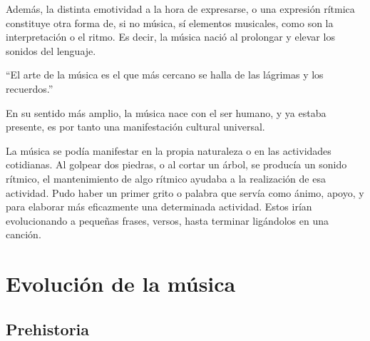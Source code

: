 Además, la distinta emotividad a la hora de expresarse, o una expresión rítmica constituye
otra forma de, si no música, sí elementos musicales, como son la interpretación o el
ritmo. Es decir, la música nació al prolongar y elevar los sonidos del lenguaje. 
 
“El arte de la música es el que más cercano se 
halla de las lágrimas y los recuerdos.”
 
En su sentido más amplio, la música nace con el ser humano, y ya estaba presente, es por
tanto una manifestación cultural universal.

La música se podía manifestar en la propia naturaleza o en las actividades cotidianas. Al
golpear dos piedras, o al cortar un árbol, se producía un sonido rítmico, el mantenimiento
de algo rítmico ayudaba a la realización de esa actividad. Pudo haber un primer grito o
palabra que servía como ánimo, apoyo, y para elaborar más eficazmente una determinada
actividad. Estos irían evolucionando a pequeñas frases, versos, hasta terminar ligándolos
en una canción.

\nomenclature[g-p]{$\pi$}{ $\simeq 3.14\ldots$}                                             %


\section{Evolución de la música	} %
\subsection{Prehistoria}

